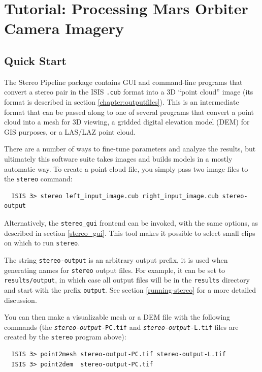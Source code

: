 \chapter{Tutorial: Processing Mars Orbiter Camera Imagery}
\label{ch:moc_tutorial}


\section{Quick Start}
\label{quickstart}

The Stereo Pipeline package contains GUI and command-line programs that
convert a stereo pair in the ISIS \texttt{.cub} format into a 3D ``point
cloud'' image (its format is described in section \ref{chapter:outputfiles}).
This is an intermediate format that can be passed along
to one of several programs that convert a point cloud into a mesh for 3D
viewing, a gridded digital elevation model (DEM) for GIS purposes, or a
LAS/LAZ point cloud.

There are a number of ways to fine-tune parameters and analyze the
results, but ultimately this software suite takes images and builds
models in a mostly automatic way.  To create a point cloud file, you
simply pass two image files to the \texttt{stereo} command:

\begin{verbatim}
  ISIS 3> stereo left_input_image.cub right_input_image.cub stereo-output
\end{verbatim}

Alternatively, the \texttt{stereo\_gui} frontend can be invoked, with
the same options, as described in section \ref{stereo_gui}. This tool
makes it possible to select small clips on which to run \texttt{stereo}.

The string \texttt{stereo-output} is an arbitrary output prefix, it is
used when generating names for \texttt{stereo} output files. For
example, it can be set to \texttt{results/output}, in which case all
output files will be in the \texttt{results} directory and start with
the prefix \texttt{output}. See section \ref{running-stereo} for a more
detailed discussion.

You can then make a visualizable mesh or a \ac{DEM} file with the following
commands (the \texttt{\textit{stereo-output}-PC.tif} and
\texttt{\textit{stereo-output}-L.tif} files are created by the
\texttt{stereo} program above):

\begin{verbatim}
  ISIS 3> point2mesh stereo-output-PC.tif stereo-output-L.tif
  ISIS 3> point2dem  stereo-output-PC.tif
\end{verbatim}

